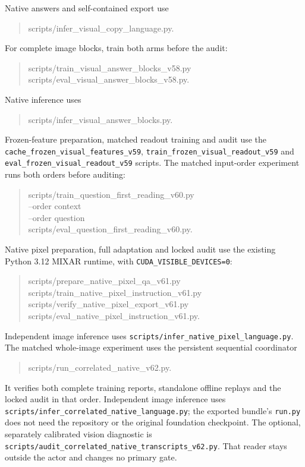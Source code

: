 \documentclass[10pt,a4paper]{article}
\begin{document}
Native answers and self-contained export use
\begin{quote}\small\ttfamily
scripts/infer\_visual\_copy\_language.py.
\end{quote}
For complete image blocks, train both arms before the audit:
\begin{quote}\small\ttfamily
scripts/train\_visual\_answer\_blocks\_v58.py\\
scripts/eval\_visual\_answer\_blocks\_v58.py.
\end{quote}
Native inference uses
\begin{quote}\small\ttfamily
scripts/infer\_visual\_answer\_blocks.py.
\end{quote}
Frozen-feature preparation, matched readout training and audit use the
\texttt{cache\_frozen\_visual\_features\_v59},
\texttt{train\_frozen\_visual\_readout\_v59} and
\texttt{eval\_frozen\_visual\_readout\_v59} scripts.
The matched input-order experiment runs both orders before auditing:
\begin{quote}\small\ttfamily
scripts/train\_question\_first\_reading\_v60.py\\
--order context\\
--order question\\
scripts/eval\_question\_first\_reading\_v60.py.
\end{quote}
Native pixel preparation, full adaptation and locked audit use the existing
Python 3.12 MIXAR runtime, with \texttt{CUDA\_VISIBLE\_DEVICES=0}:
\begin{quote}\small\ttfamily
scripts/prepare\_native\_pixel\_qa\_v61.py\\
scripts/train\_native\_pixel\_instruction\_v61.py\\
scripts/verify\_native\_pixel\_export\_v61.py\\
scripts/eval\_native\_pixel\_instruction\_v61.py.
\end{quote}
Independent image inference uses
\texttt{scripts/infer\_native\_pixel\_language.py}.
The matched whole-image experiment uses the persistent sequential coordinator
\begin{quote}\small\ttfamily
scripts/run\_correlated\_native\_v62.py.
\end{quote}
It verifies both complete training reports, standalone offline replays and
the locked audit in that order. Independent image inference uses
\texttt{scripts/infer\_correlated\_native\_language.py};
the exported bundle's \texttt{run.py} does not need the repository or the
original foundation checkpoint. The optional, separately calibrated vision
diagnostic is \texttt{scripts/audit\_correlated\_native\_transcripts\_v62.py}.
That reader stays outside the actor and changes no primary gate.

\end{document}
